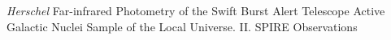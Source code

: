 \textit{Herschel} Far-infrared Photometry of the Swift Burst Alert Telescope Active Galactic Nuclei Sample of the Local Universe. II. SPIRE Observations